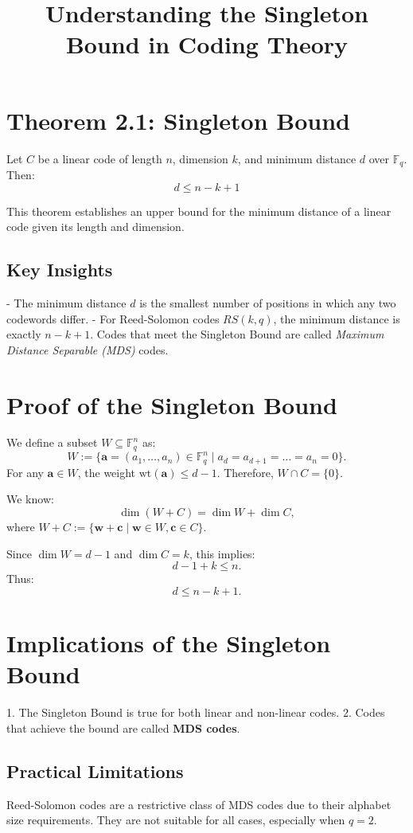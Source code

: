 \documentclass[12pt]{article}
\begin{document}
\title{Understanding the Singleton Bound in Coding Theory}
\author{}
\date{}
\maketitle

\section*{Theorem 2.1: Singleton Bound}
Let \( C \) be a linear code of length \( n \), dimension \( k \), and minimum distance \( d \) over \( \mathbb{F}_q \). Then:
\[
d \leq n - k + 1
\]

This theorem establishes an upper bound for the minimum distance of a linear code given its length and dimension.

\subsection*{Key Insights}
- The minimum distance \( d \) is the smallest number of positions in which any two codewords differ.
- For Reed-Solomon codes \( RS(k, q) \), the minimum distance is exactly \( n - k + 1 \). Codes that meet the Singleton Bound are called \textit{Maximum Distance Separable (MDS)} codes.

\section*{Proof of the Singleton Bound}
We define a subset \( W \subseteq \mathbb{F}_q^n \) as:
\[
W := \{ \mathbf{a} = (a_1, \dots, a_n) \in \mathbb{F}_q^n \mid a_d = a_{d+1} = \dots = a_n = 0 \}.
\]
For any \( \mathbf{a} \in W \), the weight \( \text{wt}(\mathbf{a}) \leq d - 1 \). Therefore, \( W \cap C = \{0\} \).

We know:
\[
\dim(W + C) = \dim W + \dim C,
\]
where \( W + C := \{\mathbf{w} + \mathbf{c} \mid \mathbf{w} \in W, \mathbf{c} \in C \} \).

Since \( \dim W = d - 1 \) and \( \dim C = k \), this implies:
\[
d - 1 + k \leq n.
\]
Thus:
\[
d \leq n - k + 1.
\]

\section*{Implications of the Singleton Bound}
1. The Singleton Bound is true for both linear and non-linear codes. 
2. Codes that achieve the bound are called \textbf{MDS codes}.

\subsection*{Practical Limitations}
Reed-Solomon codes are a restrictive class of MDS codes due to their alphabet size requirements. They are not suitable for all cases, especially when \( q = 2 \).
\end{document}
